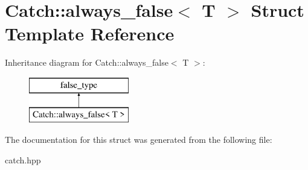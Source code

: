 \hypertarget{structCatch_1_1always__false}{}\section{Catch\+::always\+\_\+false$<$ T $>$ Struct Template Reference}
\label{structCatch_1_1always__false}
Inheritance diagram for Catch\+::always\+\_\+false$<$ T $>$\+:\begin{figure}[H]
\begin{center}
\leavevmode
\includegraphics[height=2.000000cm]{structCatch_1_1always__false}
\end{center}
\end{figure}


The documentation for this struct was generated from the following file\+:\begin{DoxyCompactItemize}
\item 
catch.\+hpp\end{DoxyCompactItemize}
